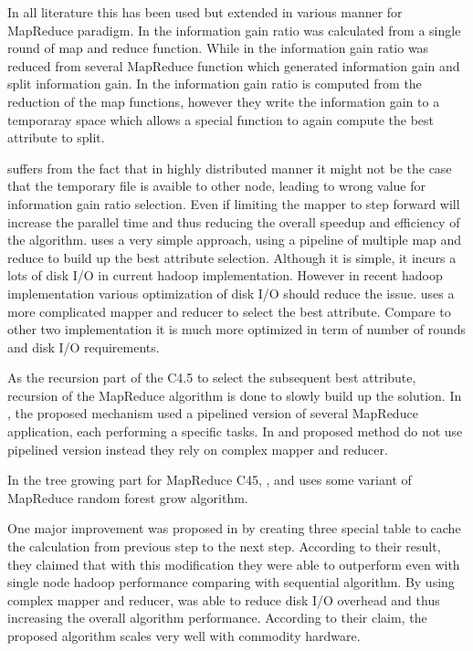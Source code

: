 \documentclass{article}
\begin{document}
In all literature this has been used but extended in various manner for MapReduce paradigm. In \cite{c452017} the information gain ratio was calculated from a single round of map and reduce function. While in \cite{c45cn} the information gain ratio was reduced from several MapReduce function which generated information gain and split information gain. In \cite {c45in} the information gain ratio is computed from the reduction of the map functions, however they write the information gain to a temporaray space which allows a special function to again compute the best attribute to split.

\cite{c45in} suffers from the fact that in highly distributed manner it might not be the case that the temporary file is avaible to other node, leading to wrong value for information gain ratio selection. Even if limiting the mapper to step forward will increase the parallel time and thus reducing the overall speedup and efficiency of the algorithm. \cite{c45cn} uses a very simple approach, using a pipeline of multiple map and reduce to build up the best attribute selection. Although it is simple, it incurs a lots of disk I/O in current hadoop implementation. However in recent hadoop implementation various optimization of disk I/O should reduce the issue. \cite{c452017} uses a more complicated mapper and reducer to select the best attribute. Compare to other two implementation it is much more optimized in term of number of rounds and disk I/O requirements.

\BlankLine
As the recursion part of the C4.5 to select the subsequent best attribute, recursion of the MapReduce algorithm is done to slowly build up the solution. In \cite{c45cn}, the proposed mechanism used a pipelined version of several MapReduce application, each performing a specific tasks. In \cite{c452017} and \cite{c45in} proposed method do not use pipelined version instead they rely on complex mapper and reducer.

\BlankLine
In the tree growing part for MapReduce C45, \cite{c452017}, \cite{c45cn} and \cite{c45in} uses some variant of MapReduce random forest grow algorithm.

\BlankLine
One major improvement was proposed in \cite{c45cn} by creating three special table to cache the calculation from previous step to the next step. According to their result, they claimed that with this modification they were able to outperform even with single node hadoop performance comparing with sequential algorithm. By using complex mapper and reducer, \cite{c452017} was able to reduce disk I/O overhead and thus increasing the overall algorithm performance. According to their claim, the proposed algorithm scales very well with commodity hardware.
\end{document}
